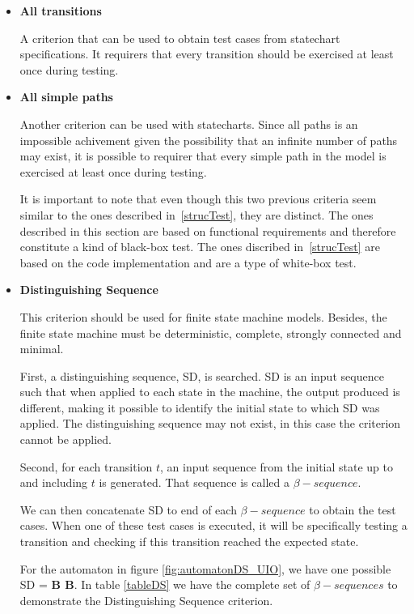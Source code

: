 \begin{itemize}

\item \textbf{All transitions}

A criterion that can be used to obtain test cases from statechart specifications. It requirers that every transition should be exercised at least once during testing.

\item \textbf{All simple paths}

Another criterion can be used with statecharts. Since all paths is an impossible achivement given the possibility that an infinite number of paths may exist, it is possible to requirer that every simple path in the model is exercised at least once during testing.

It is important to note that even though this two previous criteria seem similar to the ones described in~\ref{strucTest}, they are distinct. The ones described in this section are based on functional requirements and therefore constitute a kind of black-box test. The ones discribed in~\ref{strucTest} are based on the code implementation and are a type of white-box test.

\item \textbf{Distinguishing Sequence}

This criterion should be used for finite state machine models. Besides, the finite state machine must be deterministic, complete, strongly connected and minimal. 

First, a distinguishing sequence, SD, is searched. SD is an input sequence such that when applied to each state in the machine, the output produced is different, making it possible to identify the initial state to which SD was applied. The distinguishing sequence may not exist, in this case the criterion cannot be applied.

Second, for each transition $t$, an input sequence from the initial state up to and including $t$ is generated. That sequence is called a $\beta-sequence$.

We can then concatenate SD to end of each $\beta-sequence$ to obtain the test cases. When one of these test cases is executed, it will be specifically testing a transition and checking if this transition reached the expected state.

For the automaton in figure \ref{fig:automatonDS_UIO}, we have one possible SD = \textbf{B B}. In table \ref{tableDS} we have the complete set of $\beta-sequences$ to demonstrate the Distinguishing Sequence criterion.


\end{itemize}
